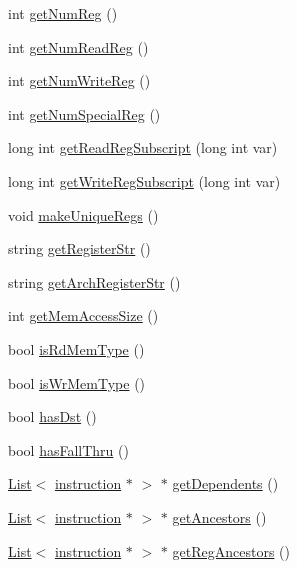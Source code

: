\begin{DoxyCompactItemize}
\item 
int \hyperlink{classinstruction_af64e1265e882da7e152bd47cb7794c3b}{getNumReg} ()
\item 
int \hyperlink{classinstruction_ae0a1ee97e6ba7920c41dd35f97b1715a}{getNumReadReg} ()
\item 
int \hyperlink{classinstruction_a293a8975be22485ec002ef7cc0466d0a}{getNumWriteReg} ()
\item 
int \hyperlink{classinstruction_a123544344e4578778985e3b6a34dea8c}{getNumSpecialReg} ()
\item 
long int \hyperlink{classinstruction_a7824d148fcdeb6a1b7cafd68a7ce99ef}{getReadRegSubscript} (long int var)
\item 
long int \hyperlink{classinstruction_a1253eafd0173b6daef17fed2311c6bcf}{getWriteRegSubscript} (long int var)
\item 
void \hyperlink{classinstruction_ae406e3e00f408b7b54510867c88b1b5d}{makeUniqueRegs} ()
\item 
string \hyperlink{classinstruction_acd4f756120e0bd6cdb127715c295a5e7}{getRegisterStr} ()
\item 
string \hyperlink{classinstruction_a4cbd72801622336cca5bf1061f3cda6a}{getArchRegisterStr} ()
\item 
int \hyperlink{classinstruction_a7811c2dd5418e30c53d2da2460e0d47c}{getMemAccessSize} ()
\item 
bool \hyperlink{classinstruction_abf5f8947b16c91c4e21b82bec378008f}{isRdMemType} ()
\item 
bool \hyperlink{classinstruction_a0eab1a0a392f17d7ec46e6dbf1ce21fb}{isWrMemType} ()
\item 
bool \hyperlink{classinstruction_ac0f0a724c1207fd9c2aad8897f3c9842}{hasDst} ()
\item 
bool \hyperlink{classinstruction_a2d7b01a0443263782d84906eb8c35ccc}{hasFallThru} ()
\item 
\hyperlink{classList}{List}$<$ \hyperlink{classinstruction}{instruction} $\ast$ $>$ $\ast$ \hyperlink{classinstruction_ad1af63e7f1bfa160b0719027c2a0b8ce}{getDependents} ()
\item 
\hyperlink{classList}{List}$<$ \hyperlink{classinstruction}{instruction} $\ast$ $>$ $\ast$ \hyperlink{classinstruction_af6165d6c8ba00c6806eda36e36cb3366}{getAncestors} ()
\item 
\hyperlink{classList}{List}$<$ \hyperlink{classinstruction}{instruction} $\ast$ $>$ $\ast$ \hyperlink{classinstruction_a90450afccd1b4b07bd28b2ee8aabdf6d}{getRegAncestors} ()
\item 

\end{DoxyCompactItemize}
